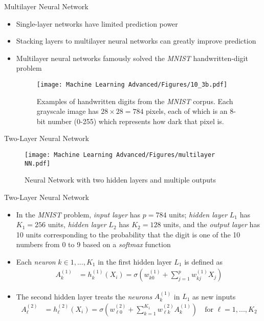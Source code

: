 \documentclass[aspectratio=1610,12pt,xcolor=dvipsnames]{beamer}
\begin{document}
\begin{frame}{Multilayer Neural Network}

\begin{itemize}
    \item Single-layer networks have limited prediction power
    \item Stacking layers to multilayer neural networks can greatly improve prediction
    \item Multilayer neural networks famously solved the \textit{MNIST} handwritten-digit problem
    \begin{figure}
    \centering
    \texttt{[image: Machine Learning Advanced/Figures/10\_3b.pdf]}
    \captionsetup{width=0.8\linewidth}
    \caption{Examples of handwritten digits from the \textit{MNIST} corpus. Each grayscale image has $28 \times 28 = 784$ pixels, each of which is an 8-bit number (0-255) which represents how dark that pixel is.}
\end{figure}
\end{itemize}
\end{frame}

\begin{frame}{Two-Layer Neural Network}

\begin{figure}
    \centering
    \texttt{[image: Machine Learning Advanced/Figures/multilayer NN.pdf]}
    \caption{Neural Network with two hidden layers and multiple outputs}
    \label{fig:multilayerNN}
\end{figure}
\end{frame}

\begin{frame}{Two-Layer Neural Network}

\begin{itemize}
    \item In the \textit{MNIST} problem, \textit{input layer} has $p = 784$ units; \textit{hidden layer} $L_1$ has $K_1=256$ units, \textit{hidden layer} $L_2$ has $K_2=128$ units, and the \textit{output layer} has 10 units corresponding to the probability that the digit is one of the 10 numbers from 0 to 9 based on a \textit{softmax} function
    \item Each \textit{neuron} $k \in 1,...,K_1$ in the first hidden layer $L_1$ is defined as
    \begin{align*}
        A_{k}^{(1)} &= h_k^{(1)}(X_i) = \sigma \left(w_{k0}^{(1)} + \sum_{j=1}^{p} w_{kj}^{(1)}X_j \right)
    \end{align*}
    \item The second hidden layer treats the \textit{neurons} $A_{k}^{(1)}$ in $L_1$ as new inputs
    \begin{align*}
        A_{\ell}^{(2)} &= h_{\ell}^{(2)}(X_i) = \sigma \left(w_{\ell 0}^{(2)} + \sum_{k=1}^{K_1} w_{\ell k}^{(2)}A_k^{(1)} \right) \quad \text{for } \ell = 1,...,K_2
    \end{align*}
\end{itemize}
\end{frame}
\end{document}
